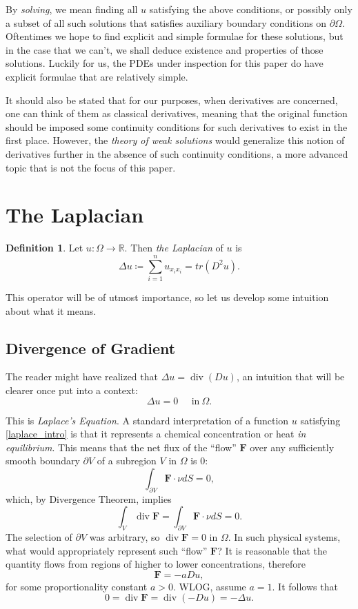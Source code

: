 \documentclass[openany, amssymb, psamsfonts]{amsart}
\theoremstyle{definition}
\newtheorem{defn}{Definition}[section]
\numberwithin{equation}{section}
\newcommand{\bbr}{\mathbb{R}}
\DeclareMathOperator{\Div}{div}
\begin{document}
By \textit{solving}, we mean finding all $u$ satisfying the above conditions, or possibly only a subset of all such solutions that satisfies auxiliary boundary conditions on $\partial \Omega$. Oftentimes we hope to find explicit and simple formulae for these solutions, but in the case that we can't, we shall deduce existence and properties of those solutions. Luckily for us, the PDEs under inspection for this paper do have explicit formulae that are relatively simple.

It should also be stated that for our purposes, when derivatives are concerned, one can think of them as classical derivatives, meaning that the original function should be imposed some continuity conditions for such derivatives to exist in the first place. However, the \textit{theory of weak solutions} would generalize this notion of derivatives further in the absence of such continuity conditions, a more advanced topic that is not the focus of this paper.
\section{The Laplacian}
\begin{defn}
    Let $u: \Omega \to \bbr$. Then \textit{the Laplacian} of $u$ is \[
        \Delta u \coloneqq \sum_{i=1}^{n} u_{x_i x_i} = tr(D^2 u).
    \]
\end{defn}

This operator will be of utmost importance, so let us develop some intuition about what it means.

\subsection{Divergence of Gradient}
The reader might have realized that $\Delta u = \Div (D u)$, an intuition that will be clearer once put into a context:
\begin{equation} \label{laplace_intro}
    \Delta u = 0 \;\;\;\;\; \text{in}\: \Omega.
\end{equation}

This is \textit{Laplace's Equation}. A standard interpretation of a function $u$ satisfying \eqref{laplace_intro} is that it represents a chemical concentration or heat \textit{in equilibrium}. This means that the net flux of the ``flow'' $\mathbf{F}$ over any sufficiently smooth boundary $\partial V$ of a subregion $V$ in $\Omega$ is 0:
\[
    \int_{\partial V} \mathbf{F} \cdot \nu dS = 0,
\]
which, by Divergence Theorem, implies \[
    \int_{V} \Div \mathbf{F} = \int_{\partial V} \mathbf{F} \cdot \nu dS = 0.
\]
The selection of $\partial V $ was arbitrary, so $\Div \mathbf{F} = 0$ in $\Omega$. In such physical systems, what would appropriately represent such ``flow'' $\mathbf{F}$? It is reasonable that the quantity flows from regions of higher to lower concentrations, therefore \[
    \mathbf{F} = -a D u,
\] for some proportionality constant $a>0$. WLOG, assume $a = 1$. It follows that \[
    0 = \Div \mathbf{F} = \Div (-Du) = - \Delta u.
\]
\end{document}

